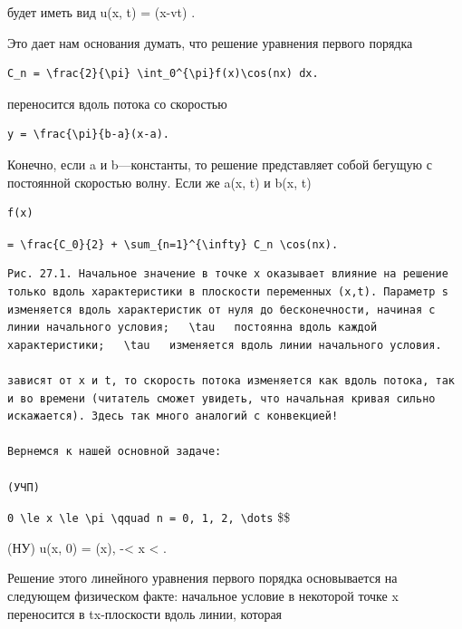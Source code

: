 \documentclass[
  ukrainian,
]{article}
\begin{document}
будет иметь вид u(x, t) = \varphi(x-vt) .

Это дает нам основания думать, что решение уравнения первого порядка

\begin{verbatim}
C_n = \frac{2}{\pi} \int_0^{\pi}f(x)\cos(nx) dx.
\end{verbatim}

переносится вдоль потока со скоростью

\begin{verbatim}
y = \frac{\pi}{b-a}(x-a).
\end{verbatim}

Конечно, если a и b---константы, то решение представляет собой бегущую с
постоянной скоростью волну. Если же a(x, t) и b(x, t)

\begin{verbatim}
f(x)
\end{verbatim}

\texttt{=\ \textbackslash{}frac\{\textquotesingle{}C\_0\textquotesingle{}\}\{2\}\ +\ \textbackslash{}sum\_\{n=1\}\^{}\{\textbackslash{}infty\}\ \textquotesingle{}C\_n\textquotesingle{}\ \textbackslash{}cos(nx).}

\begin{verbatim}
Рис. 27.1. Начальное значение в точке x оказывает влияние на решение только вдоль характеристики в плоскости переменных (x,t). Параметр s изменяется вдоль характеристик от нуля до бесконечности, начиная с линии начального условия;   \tau   постоянна вдоль каждой характеристики;   \tau   изменяется вдоль линии начального условия.

зависят от x и t, то скорость потока изменяется как вдоль потока, так и во времени (читатель сможет увидеть, что начальная кривая сильно искажается). Здесь так много аналогий с конвекцией!

Вернемся к нашей основной задаче:

(УЧП)
\end{verbatim}

\texttt{0\ \textbackslash{}le\ x\ \textbackslash{}le\ \textquotesingle{}\textbackslash{}pi\textquotesingle{}\ \textbackslash{}qquad\ n\ =\ 0,\ 1,\ 2,\ \textbackslash{}dots}
\$\$

(НУ) u(x, 0) = \varphi(x), -\infty \textless{} x \textless{} \infty.

Решение этого линейного уравнения первого порядка основывается на
следующем физическом факте: начальное условие в некоторой точке x
переносится в tx-плоскости вдоль линии, которая
\end{document}
